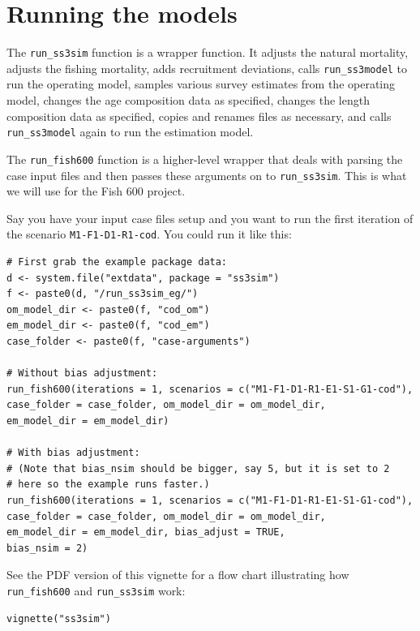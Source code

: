 \documentclass[12pt]{article}
\begin{document}
\section{Running the models}

The \texttt{run\_ss3sim} function is a wrapper function. It adjusts the natural 
mortality, adjusts the fishing mortality, adds recruitment deviations, calls 
\texttt{run\_ss3model} to run the operating model, samples various survey 
estimates from the operating model, changes the age composition data as 
specified, changes the length composition data as specified, copies and renames 
files as necessary, and calls \texttt{run\_ss3model} again to run the 
estimation model.

The \texttt{run\_fish600} function is a higher-level wrapper that deals with 
parsing the case input files and then passes these arguments on to 
\texttt{run\_ss3sim}. This is what we will use for the Fish 600 project.

Say you have your input case files setup and you want to run the first 
iteration of the scenario \texttt{M1-F1-D1-R1-cod}. You could run it like this:

\begin{verbatim}
# First grab the example package data:
d <- system.file("extdata", package = "ss3sim")
f <- paste0(d, "/run_ss3sim_eg/")
om_model_dir <- paste0(f, "cod_om")
em_model_dir <- paste0(f, "cod_em")
case_folder <- paste0(f, "case-arguments")

# Without bias adjustment:
run_fish600(iterations = 1, scenarios = c("M1-F1-D1-R1-E1-S1-G1-cod"),
case_folder = case_folder, om_model_dir = om_model_dir,
em_model_dir = em_model_dir)

# With bias adjustment:
# (Note that bias_nsim should be bigger, say 5, but it is set to 2
# here so the example runs faster.)
run_fish600(iterations = 1, scenarios = c("M1-F1-D1-R1-E1-S1-G1-cod"),
case_folder = case_folder, om_model_dir = om_model_dir,
em_model_dir = em_model_dir, bias_adjust = TRUE,
bias_nsim = 2)
\end{verbatim}

See the PDF version of this vignette for a flow chart illustrating how 
\texttt{run\_fish600} and \texttt{run\_ss3sim} work:

\begin{verbatim}
vignette("ss3sim")
\end{verbatim}
\end{document}
